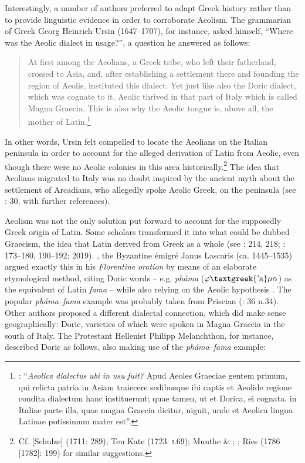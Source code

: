\documentclass[output=paper]{langsci/langscibook}
\begin{document}
Interestingly, a number of authors preferred to adapt Greek history rather than to provide linguistic evidence in order to corroborate Aeolism. The grammarian of Greek Georg Heinrich Ursin (1647–1707), for instance, asked himself, “Where was the Aeolic dialect in usage?”, a question he answered as follows:

\begin{quote}
At first among the Aeolians, a Greek tribe, who left their fatherland, crossed to Asia, and, after establishing a settlement there and founding the region of Aeolis, instituted this dialect. Yet just like also the Doric dialect, which was cognate to it, Aeolic thrived in that part of Italy which is called Magna Graecia. This is also why the Aeolic tongue is, above all, the mother of Latin.\footnote{\citet[509]{Ursin1691}: “\textit{Aeolica} \textit{dialectus} \textit{ubi} \textit{in} \textit{usu} \textit{fuit?} Apud Aeoles Graeciae gentem primum, qui relicta patria in Asiam traiecere sedibusque ibi captis et Aeolide regione condita dialectum hanc instituerunt; quae tamen, ut et Dorica, ei cognata, in Italiae parte illa, quae magna Graecia dicitur, uiguit, unde et Aeolica lingua Latinae potissimum mater est”.}
\end{quote}

In other words, Ursin felt compelled to locate the Aeolians on the Italian peninsula in order to account for the alleged derivation of Latin from Aeolic, even though there were no Aeolic colonies in this area historically.\footnote{Cf. [Schulze] (1711: 289); Ten Kate (1723: \textsc{i}.69); Munthe \& \citet[30]{Heiberg1748}; \citet[89]{Facius1782}; Ries (1786 [1782]: 199) for similar suggestions.} The idea that Aeolians migrated to Italy was no doubt inspired by the ancient myth about the settlement of Arcadians, who allegedly spoke Aeolic Greek, on the peninsula (see \citealt{Lamers2019}: 30, with further references).

Aeolism was not the only solution put forward to account for the supposedly Greek origin of Latin. Some scholars transformed it into what could be dubbed Graecism, the idea that Latin derived from Greek as a whole (see \citealt{Tavoni1986}: 214, 218; \citealt{Lamers2015}: 173–180, 190–192; 2019). \citealt{In1493}, the Byzantine émigré Janus Lascaris (ca. 1445–1535) argued exactly this in his \textit{Florentine} \textit{oration} by means of an elaborate etymological method, citing Doric words – e.g. \textit{pháma} ($\varphi \text{\textgreek{'a}}\mu \alpha $) as the equivalent of Latin \textit{fama} – while also relying on the Aeolic hypothesis \citep[179]{Lamers2015}. The popular \textit{pháma}–\textit{fama} example was probably taken from Priscian (\citealt{Lamers2019}: 36 n.34). Other authors proposed a different dialectal connection, which did make sense geographically: Doric, varieties of which were spoken in Magna Graecia in the south of Italy. The Protestant Hellenist Philipp Melanchthon, for instance, described Doric as follows, also making use of the \textit{pháma}–\textit{fama} example:
\end{document}
